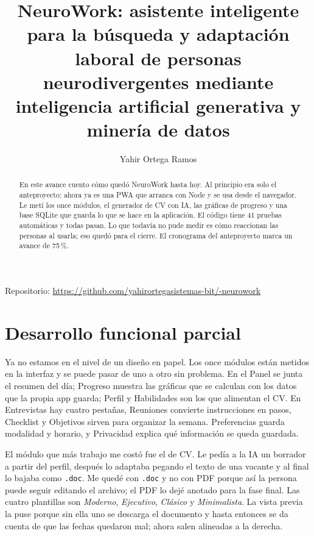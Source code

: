 \documentclass[runningheads]{llncs}
\begin{document}
\title{NeuroWork: asistente inteligente para la búsqueda y adaptación laboral de personas neurodivergentes mediante inteligencia artificial generativa y minería de datos}

\author{Yahir Ortega Ramos}

\maketitle

\begin{abstract}
En este avance cuento cómo quedó NeuroWork hasta hoy. Al principio era solo el anteproyecto;
ahora ya es una PWA que arranca con Node y se usa desde el navegador. Le metí los once módulos,
el generador de CV con IA, las gráficas de progreso y una base SQLite que guarda lo que se hace
en la aplicación. El código tiene 41 pruebas automáticas y todas pasan. Lo que todavía no pude
medir es cómo reaccionan las personas al usarla; eso quedó para el cierre. El cronograma del
anteproyecto marca un avance de 75\,\%.

\end{abstract}

\noindent Repositorio: \url{https://github.com/yahirortegasistemas-bit/-neurowork}

\section{Desarrollo funcional parcial}
Ya no estamos en el nivel de un diseño en papel. Los once módulos están metidos en la interfaz
y se puede pasar de uno a otro sin problema. En el Panel se junta el resumen del día; Progreso
muestra las gráficas que se calculan con los datos que la propia app guarda; Perfil y
Habilidades son los que alimentan el CV. En Entrevistas hay cuatro pestañas, Reuniones convierte
instrucciones en pasos, Checklist y Objetivos sirven para organizar la semana. Preferencias
guarda modalidad y horario, y Privacidad explica qué información se queda guardada.

El módulo que más trabajo me costó fue el de CV. Le pedía a la IA un borrador a partir del
perfil, después lo adaptaba pegando el texto de una vacante y al final lo bajaba como
\texttt{.doc}. Me quedé con \texttt{.doc} y no con PDF porque así la persona puede seguir
editando el archivo; el PDF lo dejé anotado para la fase final. Las cuatro plantillas son
\emph{Moderno}, \emph{Ejecutivo}, \emph{Clásico} y \emph{Minimalista}. La vista previa la puse
porque sin ella uno se descarga el documento y hasta entonces se da cuenta de que las fechas
quedaron mal; ahora salen alineadas a la derecha.
\end{document}
